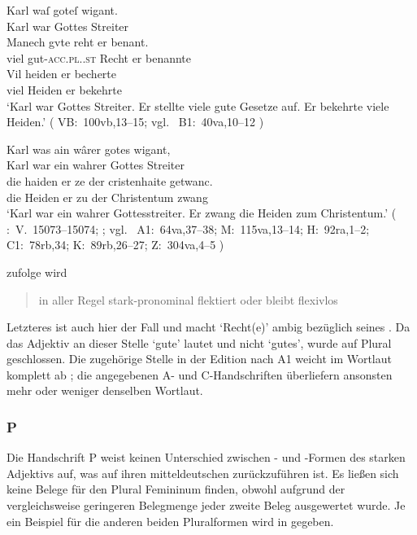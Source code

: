 \begin{exe}
\ex \label{ex:kcvbaccplne}
	\begin{xlist}
	\ex \gll Karl waſ goteſ wigant. \\
			Karl war Gottes Streiter \\
	\sn \gll Manech gvte reht er benant. \\
			viel gut-\textsc{acc.pl.\NeutI.st} Recht er benannte \\
	\sn \gll Vil heiden er becherte \\
			viel Heiden er bekehrte \\
		\trans `Karl war Gottes Streiter. Er stellte viele gute
			Gesetze auf. Er bekehrte viele Heiden.'
			(%
				VB:~100vb,13--15; vgl.~%
				B1:~40va,10--12%
			)
		\label{ex:kcvbaccplne_2}

	\ex \gll Karl was ain wârer gotes wigant, \\
			Karl war ein wahrer Gottes Streiter \\
	\sn \gll die haiden er ze der cristenhaite getwanc. \\
			die Heiden er zu der Christentum zwang \\
		\trans `Karl war ein wahrer Gottesstreiter. Er zwang die Heiden
			zum Christentum.'
			(%
				\KC:~V.~15073--15074;
				\citet[354]{schroeder1895}; vgl.~%
				A1:~64va,37--38;
				M:~115va,13--14;
				H:~92ra,1--2;
				C1:~78rb,34;
				K:~89rb,26--27;
				Z:~304va,4--5%
			)
		\label{ex:kcvbaccplne_4}
		\\
	\end{xlist}
\end{exe}

\citet[585]{ksw2} zufolge wird  \blockquote{in aller Regel
stark-pronominal flektiert oder bleibt flexivlos}. Letzteres ist auch hier der
Fall und macht  `Recht(e)' ambig bezüglich seines
. Da das Adjektiv an dieser Stelle  `gute' lautet und
nicht  `gutes', wurde auf Plural geschlossen. Die zugehörige Stelle
in der Edition nach A1 weicht im Wortlaut komplett ab ;
die angegebenen A- und C-Handschriften überliefern ansonsten mehr oder weniger
denselben Wortlaut.

\subsubsection{P}
Die Handschrift P weist keinen Unterschied zwischen - und
-Formen des starken Adjektivs auf, was auf ihren
mitteldeutschen  zurückzuführen ist. Es
ließen sich keine Belege für den Plural Femininum finden, obwohl aufgrund der
vergleichsweise geringeren Belegmenge jeder zweite Beleg ausgewertet wurde. Je
ein Beispiel für die anderen beiden Pluralformen wird in 
gegeben.

